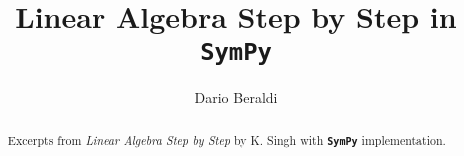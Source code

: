 \documentclass[a4paper]{article}
\newcommand{\sympy}{\textbf{\texttt{\textcolor{OliveGreen}{SymPy}} }}
\begin{document}
\title{Linear Algebra Step by Step in \sympy}

\author{Dario Beraldi}
\maketitle
\tableofcontents

\begin{abstract}
\noindent Excerpts from \textit{Linear Algebra Step by Step} by K. Singh 
with \sympy implementation.
\end{abstract}



\end{document}
